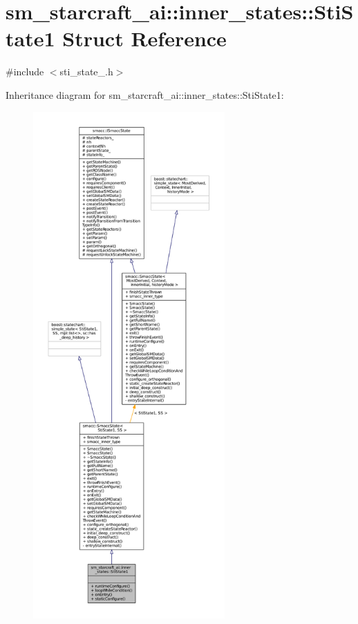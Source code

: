 \hypertarget{structsm__starcraft__ai_1_1inner__states_1_1StiState1}{}\section{sm\+\_\+starcraft\+\_\+ai\+:\+:inner\+\_\+states\+:\+:Sti\+State1 Struct Reference}
\label{structsm__starcraft__ai_1_1inner__states_1_1StiState1}


{\ttfamily \#include $<$sti\+\_\+state\+\_.\+h$>$}



Inheritance diagram for sm\+\_\+starcraft\+\_\+ai\+:\+:inner\+\_\+states\+:\+:Sti\+State1\+:
\nopagebreak
\begin{figure}[H]
\begin{center}
\leavevmode
\includegraphics[height=550pt]{structsm__starcraft__ai_1_1inner__states_1_1StiState1__inherit__graph}
\end{center}
\end{figure}



